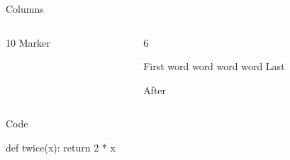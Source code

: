 \documentclass[fontset=fandol]{nbeamer}
\begin{document}
\begin{frame}[fragile]{Code}
Before  \incode|{| after.
\begin{ncode}
First

Last
\end{ncode}
After
\end{frame}
\begin{frame}[fragile]{Columns}
\begin{columns}
\begin{column}{10\nbgrid}
Marker
\end{column}
\begin{column}{6\nbgrid}
\begin{ncode}
First word word word word Last
\end{ncode}
After
\end{column}
\end{columns}
\end{frame}
\begin{frame}[fragile]{Code}
\begin{ncode}[language=Python,basicstyle={\ttfamily\footnotesize\color{red}}]
def twice(x):
    return 2 * x
\end{ncode}
\end{frame}
\end{document}
